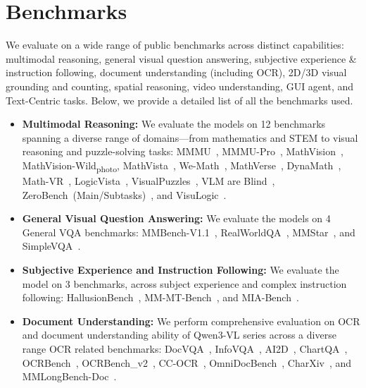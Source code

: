 \section{Benchmarks}
\label{sec:benchmarks}
We evaluate \qwenvl on a wide range of public benchmarks across distinct capabilities: multimodal reasoning, general visual question answering, subjective experience \& instruction following, document understanding (including OCR), 2D/3D visual grounding and counting, spatial reasoning,  video understanding, GUI agent, and Text-Centric tasks. Below, we provide a detailed list of all the benchmarks used.
\begin{itemize}[itemindent=0pt, labelsep=4pt, leftmargin=*]
\item \textbf{Multimodal Reasoning:} We evaluate the models on 12 benchmarks spanning a diverse range of domains—from mathematics and STEM to visual reasoning and puzzle-solving tasks: MMMU~\citep{yue2024mmmu}, MMMU-Pro~\citep{yue2024mmmupro}, MathVision~\citep{wang2024measuring}, MathVision-Wild\textsubscript{\scriptsize photo}, MathVista~\citep{lu2023mathvista}, We-Math~\citep{qiao2024we}, MathVerse~\citep{zhang2024mathverse}, DynaMath~\citep{zou2024dynamath}, Math-VR~\citep{duan2025codeplot}, LogicVista~\citep{xiao2024logicvista}, VisualPuzzles~\citep{song2025visualpuzzles},  VLM are Blind~\citep{rahmanzadehgervi2025visionlanguagemodelsblind}, ZeroBench~(Main/Subtasks)~\citep{roberts2025zerobenchimpossiblevisualbenchmark}, and
VisuLogic~\citep{xu2025visulogicbenchmarkevaluatingvisual}.
\item \textbf{General Visual Question Answering:} We evaluate the models on 4 General VQA benchmarks: MMBench-V1.1~\citep{MMBench}, RealWorldQA~\citep{realworldqa2024}, MMStar~\citep{chen2024we}, and SimpleVQA~\cite{cheng2025simplevqa}.
\item \textbf{Subjective Experience and Instruction Following:} We evaluate the model on 3 benchmarks, across subject experience and complex instruction following: HallusionBench~\citep{hallusion_bench}, MM-MT-Bench~\citep{mm_mt_bench}, and MIA-Bench~\citep{mia-bench}.
\item \textbf{Document Understanding:} We perform comprehensive evaluation on OCR and document understanding ability of Qwen3-VL series across a diverse range OCR related benchmarks: DocVQA~\citep{docvqa}, InfoVQA~\citep{Mathew2021InfographicVQA}, AI2D~\citep{Kembhavi2016AI2D}, ChartQA~\citep{masry2022chartqa}, OCRBench~\citep{Liu_2024_OCRBench}, OCRBench\_v2~\citep{fu2024ocrbenchv2improvedbenchmark}, CC-OCR~\citep{yang2024ccocrcomprehensivechallengingocr}, OmniDocBench~\citep{ouyang2024omnidocbenchbenchmarkingdiversepdf}, CharXiv~\citep{wang2024charxiv}, and MMLongBench-Doc~\citep{ma2024mmlongbench}.


\end{itemize}
